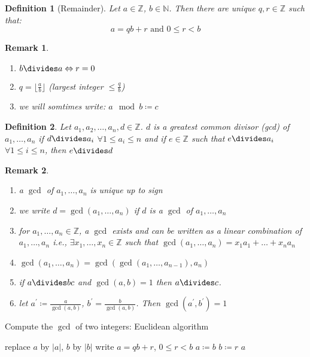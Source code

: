 \documentclass[a4paper]{article}
\newtheorem{defi}{Definition}
\newtheorem{rem}{Remark}
\newcommand{\N}{\mathbb{N}}
\newcommand{\Z}{\mathbb{Z}}
\begin{document}
\begin{defi}[Remainder]
Let $a \in \Z$, $b \in \N$. Then there are unique $q,r \in \Z$ such that:
\[a = qb + r \text{ and } 0 \leq r < b\]
\end{defi}

\begin{rem}
\begin{enumerate}
  \item $b\divides a \Leftrightarrow r = 0$
  \item $q = \lfloor \frac{a}{b} \rfloor$ (largest integer $\leq \frac{q}{b}$)
  \item we will somtimes write: $a \mod b \coloneq c$
\end{enumerate}
\end{rem}

\begin{defi}
Let $a_1,a_2,\dots,a_n,d \in \mathbb{Z}$. $d$ is a greatest common divisor (gcd) of $a_1,\dots,a_n$ if
$d\divides a_i$ $\forall 1\leq a_i \leq n$
and if $e \in \Z$ such that $e\divides a_i$ $\forall 1\leq i \leq n$, then $e\divides d$
\end{defi}

\begin{rem}
\begin{enumerate}
  \item a $\gcd$ of $a_1,\dots,a_n$ is unique up to sign
  \item we write $d = \gcd(a_1,\dots,a_n)$ if $d$ is a $\gcd$ of $a_1,\dots,a_n$
  \item for $a_1,\dots,a_n \in \Z$, a $\gcd$ exists and can be written as a linear combination of $a_1,\dots,a_n$
  i.e., $\exists x_1,\dots,x_n \in \Z$ such that $\gcd(a_1,\dots,a_n) = x_1 a_1+ \dots + x_n a_n$
  \item $\gcd(a_1,\dots,a_n) = \gcd(\gcd(a_1,\dots,a_{n-1}),a_n)$
  \item if $a\divides bc$ and $\gcd(a,b) = 1$ then $a\divides c$.
  \item let $a^\prime \coloneq \frac{a}{\gcd(a,b)}$, $b^\prime = \frac{b}{\gcd(a,b)}$. Then $\gcd(a^\prime,b^\prime) = 1$
\end{enumerate}
\end{rem}

\begin{algorithm}
  \caption{Compute the $\gcd$ of two integers: Euclidean algorithm}
  \begin{algorithmic}
    \Require{$a,b \in \Z$. $|a| \geq |b|$}
    \State replace $a$ by $|a|$, $b$ by $|b|$
      \State write $a = qb +r$, $0 \leq r < b$
      \State $a \coloneq b$
      \State $b \coloneq r$
    \EndWhile
    \State \Return $a$
  \end{algorithmic}
\end{algorithm}
\end{document}
